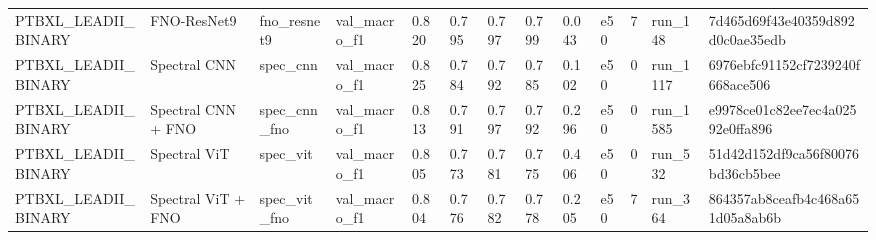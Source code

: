 \begin{longtable}{lllllllllllll}
PTBXL\_LEADII\_BINARY & FNO-ResNet9 & fno\_resnet9 & val\_macro\_f1 & 0.820 & 0.795 & 0.797 & 0.799 & 0.043 & e50 & 7 & run\_148 & 7d465d69f43e40359d892d0c0ae35edb \\
PTBXL\_LEADII\_BINARY & Spectral CNN & spec\_cnn & val\_macro\_f1 & 0.825 & 0.784 & 0.792 & 0.785 & 0.102 & e50 & 0 & run\_1117 & 6976ebfc91152cf7239240f668ace506 \\
PTBXL\_LEADII\_BINARY & Spectral CNN + FNO & spec\_cnn\_fno & val\_macro\_f1 & 0.813 & 0.791 & 0.797 & 0.792 & 0.296 & e50 & 0 & run\_1585 & e9978ce01c82ee7ec4a02592e0ffa896 \\
PTBXL\_LEADII\_BINARY & Spectral ViT & spec\_vit & val\_macro\_f1 & 0.805 & 0.773 & 0.781 & 0.775 & 0.406 & e50 & 0 & run\_532 & 51d42d152df9ca56f80076bd36cb5bee \\
PTBXL\_LEADII\_BINARY & Spectral ViT + FNO & spec\_vit\_fno & val\_macro\_f1 & 0.804 & 0.776 & 0.782 & 0.778 & 0.205 & e50 & 7 & run\_364 & 864357ab8ceafb4c468a651d05a8ab6b \\
\end{longtable}
